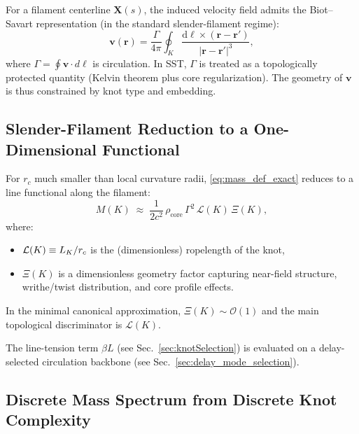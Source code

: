 \documentclass[10pt]{article}
\newcommand{\rhocore}{\rho_{\text{core}}}
\begin{document}
        For a filament centerline $\mathbf{X}(s)$, the induced velocity field admits the
        Biot--Savart representation (in the standard slender-filament regime):
        \begin{equation}
            \mathbf{v}(\mathbf{r})
            =
            \frac{\Gamma}{4\pi}\oint_K
            \frac{\mathrm{d}\boldsymbol{\ell}\times(\mathbf{r}-\mathbf{r}')}{|\mathbf{r}-\mathbf{r}'|^3},
        \end{equation}
        where $\Gamma=\oint\mathbf{v}\cdot d\boldsymbol{\ell}$ is circulation. In SST,
        $\Gamma$ is treated as a topologically protected quantity (Kelvin theorem plus
        core regularization). The geometry of $\mathbf{v}$ is thus constrained by knot
        type and embedding.

    \subsection{Slender-Filament Reduction to a One-Dimensional Functional}

        For $r_c$ much smaller than local curvature radii, \eqref{eq:mass_def_exact}
        reduces to a line functional along the filament:
        \begin{equation}
            M(K)
            \;\approx\;
            \frac{1}{2c^2}\,
            \rhocore\,\Gamma^2\,\mathcal{L}(K)\,\Xi(K),
            \label{eq:mass_slender}
        \end{equation}
        where:
        \begin{itemize}
            \item $\mathcal{L}(K)\equiv L_K/r_c$ is the (dimensionless) ropelength of the knot,
            \item $\Xi(K)$ is a dimensionless geometry factor capturing near-field structure,
            writhe/twist distribution, and core profile effects.
        \end{itemize}
        In the minimal canonical approximation, $\Xi(K)\sim \mathcal{O}(1)$ and the main
        topological discriminator is $\mathcal{L}(K)$.
        
        The line-tension term $\beta L$ (see Sec.~\ref{sec:knotSelection}) is evaluated on a delay-selected circulation backbone (see Sec.~\ref{sec:delay_mode_selection}).

    \subsection{Discrete Mass Spectrum from Discrete Knot Complexity}
\end{document}
